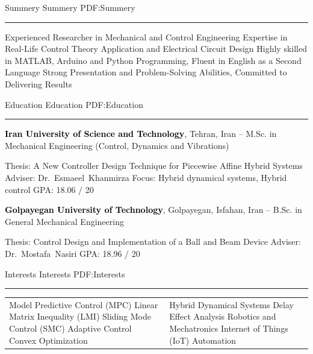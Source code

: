 \documentclass[letterpaper,MMMyyyy]{ResumeTemplate}
\begin{document}
\begin{Body}

\Section
{Summery}
{Summery}
{PDF:Summery}
\textcolor{Forestg}{\vspace{0.05cm}\hrule height 0.1cm}\BigGap
\Entry
\BulletItem Experienced Researcher in Mechanical and Control Engineering
\BulletItem Expertise in Real-Life Control Theory Application and Electrical Circuit Design
\BulletItem Highly skilled in MATLAB, Arduino and Python Programming, Fluent in English as a Second Language
\BulletItem Strong Presentation and Problem-Solving Abilities, Committed to Delivering Results

\Section
{Education}
{Education}
{PDF:Education}
\textcolor{Forestg}{\vspace{0.05cm}\hrule height 0.1cm}\BigGap
\Entry
{\textcolor{black}{\textbf{Iran University of Science and Technology}}, Tehran, Iran}
\hfill
{\textcolor{OrangeY}{ --
	}}
\Gap
\BulletItem
M.Sc. in
{Mechanical Engineering \small{(Control, Dynamics and Vibrations)}}

\begin{Detail}
\SubBulletItem
Thesis:
{A New Controller Design Technique for Piecewise Affine Hybrid Systems}
\SubBulletItem
Adviser:
Dr.~Esmaeel~Khanmirza
\SubBulletItem
Focus:
Hybrid dynamical systems, Hybrid control
\SubBulletItem
GPA: 18.06 / 20
\end{Detail}


\BigGap
\Entry
{\textcolor{black}{\textbf{Golpayegan University of Technology}},
Golpayegan, Isfahan, Iran}
\hfill
\textcolor{OrangeY}{ --
}
\Gap
\BulletItem
B.Sc. in
{General Mechanical Engineering}

\begin{Detail}
\SubBulletItem
Thesis: Control Design and Implementation of a Ball and Beam Device
\SubBulletItem
Adviser:
Dr.~Mostafa~Nasiri
\SubBulletItem
GPA: 18.96 / 20
\end{Detail}



\Section
{Interests}
{Interests}
{PDF:Interests}
\textcolor{Forestg}{\vspace{0.05cm}\hrule height 0.1cm}\BigGap
\Entry

\begin{center}
	\begin{tabular}{ m{8cm} m{8cm} }
		\BulletItem
		Model Predictive Control (MPC)
		\BulletItem
		Linear Matrix Inequality (LMI)
		\BulletItem
		Sliding Mode Control (SMC)
		\BulletItem
		Adaptive Control
		\BulletItem
		Convex Optimization
		 & \BulletItem
		Hybrid Dynamical Systems
		\BulletItem
		Delay Effect Analysis
		\BulletItem
		Robotics and Mechatronics
		\BulletItem
		Internet of Things (IoT)
		\BulletItem
		Automation
	\end{tabular}
\end{center}


\end{Body}
\end{document}
